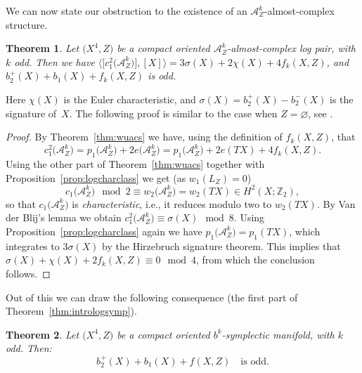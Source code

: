 \documentclass[10pt,a4paper]{amsart}
\numberwithin{equation}{section}
\newtheorem{Theorem}{Theorem}[section]
\begin{document}
We can now state our obstruction to the existence of an $\mathcal{A}^k_Z$-almost-complex structure.

\begin{Theorem}\label{thm:azalmostcplx} Let $\big(X^4,Z\big)$ be a compact oriented $\mathcal{A}^k_Z$-almost-complex log pair, with $k$ odd. Then we have $\big\langle \big[c_1^2\big(\mathcal{A}^k_Z\big)\big], [X] \big\rangle = 3 \sigma(X) + 2 \chi(X) + 4 f_k(X,Z)$, and $b_2^+(X) + b_1(X) + f_k(X,Z)$ is odd.
\end{Theorem}

Here $\chi(X)$ is the Euler characteristic, and $\sigma(X) = b_2^+(X) - b_2^-(X)$ is the signature of~$X$.
The following proof is similar to the case when $Z = \varnothing$, see \cite[Theorem~1.4.13]{GompfStipsicz99}.

\begin{proof} By Theorem~\ref{thm:wuacs} we have, using the definition of $f_k(X,Z)$, that
\begin{displaymath}
	c_1^2\big(\mathcal{A}_Z^k\big) = p_1\big(\mathcal{A}_Z^k\big) + 2 e\big(\mathcal{A}_Z^k\big) = p_1\big(\mathcal{A}_Z^k\big) + 2 e(TX) + 4 f_k(X,Z).
\end{displaymath}
Using the other part of Theorem~\ref{thm:wuacs} together with Proposition~\ref{prop:logcharclass} we get (as $w_1(L_Z) = 0$)
\begin{displaymath}
	c_1\big(\mathcal{A}_Z^k\big) \!\!\!\!\mod 2 \equiv w_2\big(\mathcal{A}_Z^k\big) = w_2(TX) \in H^2(X;\mathbb{Z}_2),
\end{displaymath}
so that $c_1\big(\mathcal{A}_Z^k\big)$ is \emph{characteristic}, i.e., it reduces modulo two to $w_2(TX)$. By Van der Blij's lemma \cite[Lemma~1.2.20]{GompfStipsicz99} we obtain $c_1^2\big(\mathcal{A}_Z^k\big) \equiv \sigma(X) \!\!\mod 8$. Using Proposition~\ref{prop:logcharclass} again we have $p_1\big(\mathcal{A}_Z^k\big) = p_1(TX)$, which integrates to $3 \sigma(X)$ by the Hirzebruch signature theorem. This implies that $\sigma(X) + \chi(X) + 2 f_k(X,Z) \equiv 0 \!\!\mod 4$, from which the conclusion follows.
\end{proof}

Out of this we can draw the following consequence (the first part of Theorem~\ref{thm:intrologsymp}).


\begin{Theorem}\label{thm:azsympstr} Let $\big(X^4,Z\big)$ be a compact oriented $b^k$-symplectic manifold, with $k$ odd. Then:
	\begin{displaymath}
		b_2^+(X) + b_1(X) + f(X,Z) \quad \text{is odd}.
	\end{displaymath}
\end{Theorem}
\end{document}
